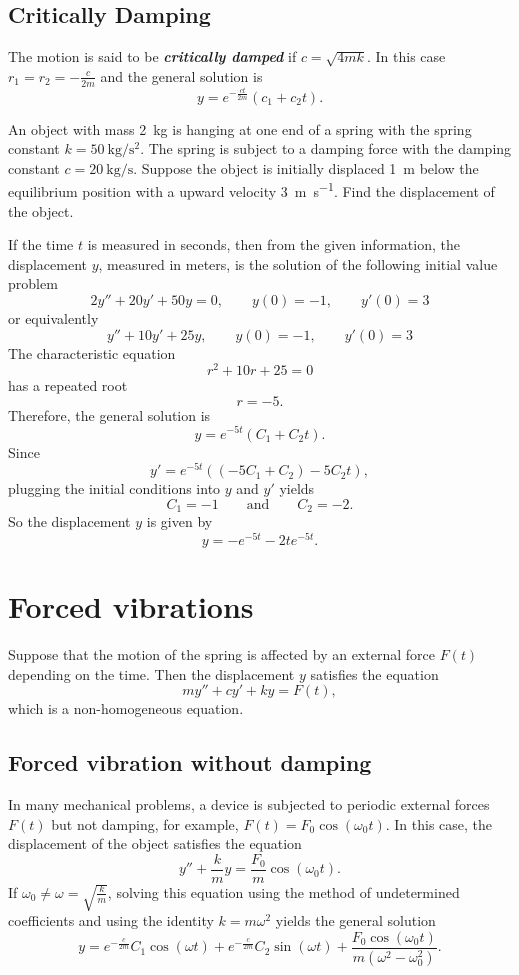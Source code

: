 \subsection*{Critically Damping}
  
The motion is said to be \emph{\textbf{critically damped}} if $c=\sqrt{4mk}$. In this case $r_1=r_2=-\frac{c}{2m}$ and the general solution is
\[y=e^{-\frac{ct}{2m}}(c_1+c_2t).\]

\begin{example} 
An object with mass \SI{2}{\kg} is hanging at one end of a spring with the spring constant $k=\SI{50}{\kg\per\square\second}$. The spring is subject to a damping force with the damping constant $c=\SI{20}{\kg\per\second}$. Suppose the object is initially displaced \SI{1}{\meter} below the equilibrium position with a upward velocity \SI{3}{\meter\per\second}. Find the displacement of the object.
\end{example}
\begin{solution}
If the time $t$ is measured in seconds, then from the given information, the displacement $y$, measured in meters, is the solution of the following initial value problem
\[2y''+ 20y'+50y=0, \qquad y(0)=-1,\qquad y'(0)=3\]
or equivalently
\[y''+10y'+25y, \qquad y(0)=-1,\qquad y'(0)=3\]
The characteristic equation
\[r^2+10r+25=0\]
has a repeated root
\[r=-5.\]
Therefore, the general solution is
\[y=e^{-5t}(C_1+C_2 t).\]
Since
\[y'=e^{-5t}((-5C_1+C_2)-5C_2 t),\]
plugging the initial conditions into $y$ and $y'$ yields
\[C_1=-1\qquad\text{and}\qquad C_2=-2.\]
So the displacement $y$ is given by
\[y=-e^{-5t}-2te^{-5t}.\]
\end{solution}

\section{Forced vibrations}

Suppose that the motion of the spring is affected by an external force $F(t)$ depending on the time. Then the displacement $y$ satisfies the equation
\[my''+cy'+ky=F(t),\]
which is a non-homogeneous equation. 

\subsection*{Forced vibration without damping}

In many mechanical problems, a device is subjected to periodic external forces $F(t)$ but not damping, for example, $F(t)=F_0\cos(\omega_0t)$. In this case, the displacement of the object satisfies the equation
\[y''+\frac{k}{m}y=\frac{F_0}{m}\cos(\omega_0t).\]
If $\omega_0\neq \omega=\sqrt{\frac{k}{m}}$, solving this equation using the method of undetermined coefficients and using the identity $k=m\omega^2$ yields the general solution
\[y=e^{-\frac{c}{2m}}C_1\cos(\omega t)+e^{-\frac{c}{2m}}C_2\sin(\omega t)+\frac{F_0\cos(\omega_0 t)}{m(\omega^2-\omega_0^2)}.\] 

